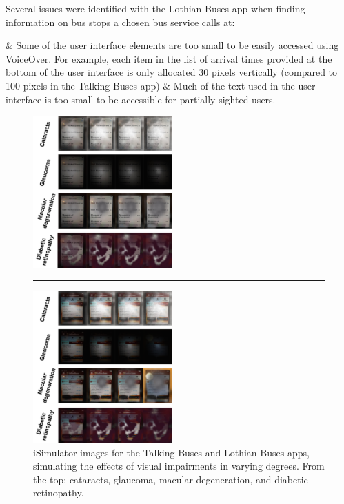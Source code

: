 \documentclass[10pt,twocolumn]{article}
\begin{document}
Several issues were identified with the Lothian Buses app when finding information on bus stops a chosen bus service calls at:
\begin{easylist}[itemize]
& Some of the user interface elements are too small to be easily accessed using VoiceOver. For example, each item in the list of arrival times provided at the bottom of the user interface is only allocated 30 pixels vertically (compared to 100 pixels in the Talking Buses app)
& Much of the text used in the user interface is too small to be accessible for partially-sighted users.
\end{easylist}

\begin{figure}[tbp]
    \includegraphics[width=0.475\textwidth,trim=80 0 0 0,clip]{tbiSim}

\textcolor{white}{\rule{20pt}{20pt}}

    \includegraphics[width=0.475\textwidth,trim=80 0 0 0,clip]{lbiSim}
    \caption{iSimulator images for the Talking Buses and Lothian Buses apps, simulating the effects of visual impairments in varying degrees.  From the top: cataracts, glaucoma, macular degeneration, and diabetic retinopathy.}
    \label{fig:tbiSim}
\end{figure}
\end{document}
